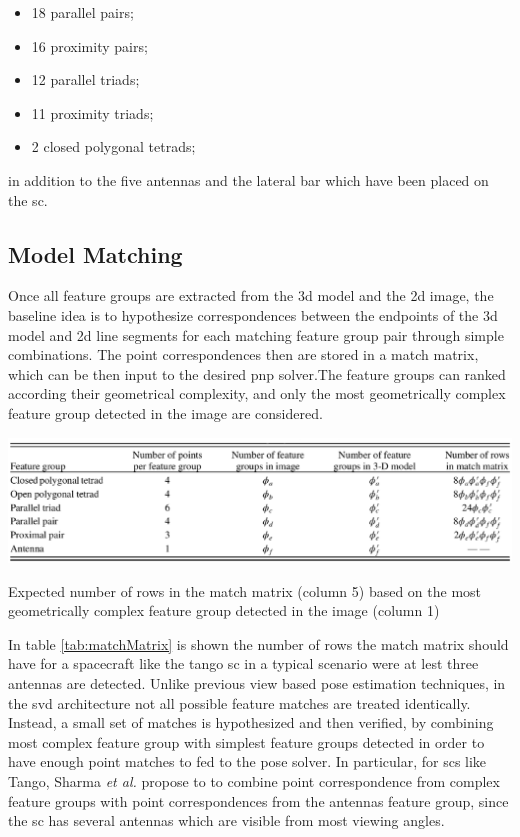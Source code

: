 \begin{itemize}
  \item 18 parallel pairs;
  \item 16 proximity pairs;
  \item 12 parallel triads;
  \item 11 proximity triads;
  \item 2 closed polygonal tetrads;
\end{itemize}

in addition to the five antennas and the lateral bar which have been placed on the \acrshort{sc}.

\subsection{Model Matching}
Once all feature groups are extracted from the \acrshort{3d} model and the \acrshort{2d} image, the baseline idea is to hypothesize correspondences between the endpoints of the \acrshort{3d} model and \acrshort{2d} line segments for each matching feature group pair through simple combinations. The point correspondences then are stored in a match matrix, which can be then input to the desired \acrshort{pnp} solver.The feature groups can ranked according their geometrical complexity, and only the most geometrically complex feature group detected in the image are considered.

\begin{table}[htbp]
  \centering
  \includegraphics[width=1.0\textwidth]{gfx/matchMatrix.eps}
  \caption{Expected number of rows in the match matrix (column 5) based on the most geometrically complex feature
    group detected in the image (column 1) \cite{Sharma2018}}
  \label{tab:matchMatrix}
\end{table}

In table \ref{tab:matchMatrix} is shown the number of rows the match matrix should have for a spacecraft like the tango \acrshort{sc} in a typical scenario were at lest three antennas are detected.
Unlike previous view based pose estimation techniques, in the \acrshort{svd} architecture not all possible feature matches are treated identically. Instead, a small set of matches is hypothesized and then verified, by combining most complex feature group with simplest feature groups detected in order to have enough point matches to fed to the pose solver. In particular, for \acrshort{sc}s like Tango, Sharma \textit{et al.} propose to to combine point correspondence from complex feature groups with point correspondences from the antennas feature group, since the \acrshort{sc} has several antennas which are visible from most viewing angles.

